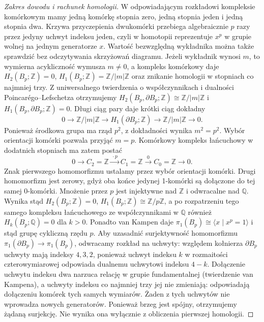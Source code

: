 \begin{proof}[Zakres dowodu i rachunek homologii]
W odpowiadającym rozkładowi kompleksie komórkowym
mamy jedną komórkę stopnia zero, jedną stopnia jeden
i jedną stopnia dwa. Krzywa przyczepienia dwukomórki
przebiega algebraicznie $p$ razy przez jedyny
uchwyt indeksu jeden, czyli w homotopii reprezentuje $x^p$
w grupie wolnej na jednym generatorze $x$.
Wartość bezwzględną wykładnika można także
sprawdzić bez odczytywania skrzyżowań diagramu.
Jeżeli wykładnik wynosi $m$, to wymierna
acykliczność wymusza $m\ne0$, a kompleks
komórkowy daje $H_2(B_p;\mathbb Z)=0$,
$H_1(B_p;\mathbb Z)=\mathbb Z/|m|\mathbb Z$
oraz znikanie homologii w stopniach co najmniej trzy.
Z uniwersalnego twierdzenia o współczynnikach
i dualności Poincarégo--Lefschetza otrzymujemy
$H_2(B_p,\partial B_p;\mathbb Z)
\cong\mathbb Z/|m|\mathbb Z$ i
$H_1(B_p,\partial B_p;\mathbb Z)=0$.
Długi ciąg pary daje krótki ciąg dokładny
\[
0\longrightarrow\mathbb Z/|m|\mathbb Z
\longrightarrow H_1(\partial B_p;\mathbb Z)
\longrightarrow\mathbb Z/|m|\mathbb Z
\longrightarrow0.
\]
Ponieważ środkowa grupa ma rząd $p^2$,
z dokładności wynika $m^2=p^2$.
Wybór orientacji komórki pozwala przyjąć $m=p$.
Komórkowy kompleks łańcuchowy w dodatnich stopniach
ma zatem postać
\[
0\longrightarrow C_2=\mathbb Z
\xrightarrow{\ \cdot p\ } C_1=\mathbb Z
\xrightarrow{\ 0\ } C_0=\mathbb Z\longrightarrow0.
\]
Znak pierwszego homomorfizmu ustalamy przez
wybór orientacji komórki. Drugi homomorfizm
jest zerowy, gdyż oba końce jedynej 1-komórki
są dołączone do tej samej 0-komórki.
Mnożenie przez $p$ jest injektywne nad $\mathbb Z$
i odwracalne nad $\mathbb Q$. Wynika stąd $H_2(B_p;\mathbb Z)=0$,
$H_1(B_p;\mathbb Z)\cong\mathbb Z/p\mathbb Z$,
a po rozpatrzeniu tego samego kompleksu łańcuchowego
ze współczynnikami w $\mathbb Q$ również
$H_k(B_p;\mathbb Q)=0$ dla $k>0$.
Ponadto van Kampen daje
$\pi_1(B_p)\cong\langle x\mid x^p=1\rangle$
i stąd grupę cykliczną rzędu $p$.
Aby uzasadnić surjektywność homomorfizmu
$\pi_1(\partial B_p)\to\pi_1(B_p)$,
odwracamy rozkład na uchwyty: względem
kołnierza $\partial B_p$ uchwyty mają
indeksy $4,3,2$, ponieważ uchwyt indeksu
$k$ w rozmaitości czterowymiarowej odpowiada
dualnemu uchwytowi indeksu $4-k$.
Dołączenie uchwytu indeksu dwa narzuca
relację w grupie fundamentalnej (twierdzenie
van Kampena), a uchwyty indeksu co najmniej
trzy jej nie zmieniają: odpowiadają dołączeniu
komórek tych samych wymiarów. Żaden z tych
uchwytów nie wprowadza nowych generatorów.
Ponieważ brzeg jest spójny, otrzymujemy
żądaną surjekcję. Nie wynika ona wyłącznie
z obliczenia pierwszej homologii.
\end{proof}

